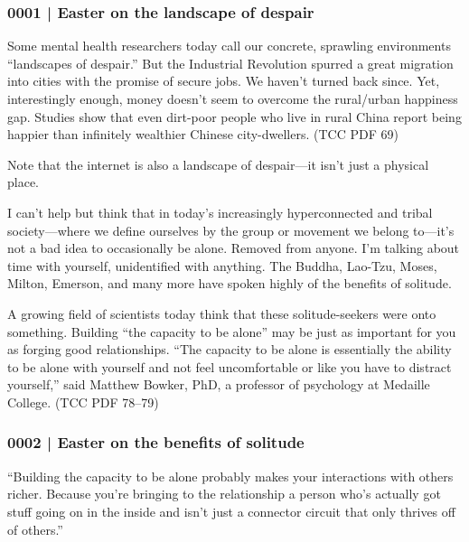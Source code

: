 		\subsubsection{0001 | Easter on the landscape of despair}
			\label{GM-LIFE-WORLD-0001}
			
			Some mental health researchers today call our concrete, sprawling environments ``landscapes of despair.'' But the Industrial Revolution spurred a great migration into cities with the promise of secure jobs. We haven't turned back since. Yet, interestingly enough, money doesn't seem to overcome the rural/urban happiness gap. Studies show that even dirt-poor people who live in rural China report being happier than infinitely wealthier Chinese city-dwellers. (TCC PDF 69)
				\begin{compactitem}
					\item Note that the internet is also a landscape of despair---it isn't just a physical place.
				\end{compactitem}
				
			I can't help but think that in today's increasingly hyperconnected and tribal society---where we define ourselves by the group or movement we belong to---it's not a bad idea to occasionally be alone. Removed from anyone. I'm talking about time with yourself, unidentified with anything. The Buddha, Lao-Tzu, Moses, Milton, Emerson, and many more have spoken highly of the benefits of solitude.

			A growing field of scientists today think that these solitude-seekers were onto something. Building ``the capacity to be alone'' may be just as important for you as forging good relationships. ``The capacity to be alone is essentially the ability to be alone with yourself and not feel uncomfortable or like you have to distract yourself,'' said Matthew Bowker, PhD, a professor of psychology at Medaille College. (TCC PDF 78--79)
			
		\subsubsection{0002 | Easter on the benefits of solitude}
			\label{GM-LIFE-WORLD-0002}
			
			``Building the capacity to be alone probably makes your interactions with others richer. Because you're bringing to the relationship a person who's actually got stuff going on in the inside and isn't just a connector circuit that only thrives off of others.'' 

